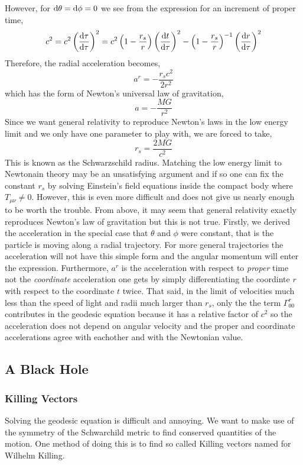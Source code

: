 \documentclass[11pt, a4paper]{article}
\begin{document}
However, for $\mathrm{d}\theta = \mathrm{d}\phi = 0$ we see from the expression for an increment of proper time,
\[ c^2  = c^2 \left( \frac{\mathrm{d}\tau}{\mathrm{d}\tau} \right)^2 =  c^2 \left(1 - \frac{r_s}{r} \right) \left( \frac{\mathrm{d}t}{\mathrm{d}\tau} \right)^2 - \left(1 - \frac{r_s}{r} \right)^{-1} \left( \frac{\mathrm{d}r}{\mathrm{d}\tau} \right)^2 \]
Therefore, the radial acceleration becomes,
\[ a^r  = -\frac{r_s c^2}{2r^2} \]
which has the form of Newton's universal law of gravitation,
\[ a = - \frac{MG}{r^2}\]
Since we want general relativity to reproduce Newton's laws in the low energy limit and we only have one parameter to play with, we are forced to take,
\[ r_s = \frac{2 M G}{c^2} \]
This is known as the Schwarzschild radius. Matching the low energy limit to Newtonain theory may be an unsatisfying argument and if so one can fix the constant $r_s$ by solving Einstein's field equations inside the compact body where $T_{\mu \nu} \neq 0$. However, this is even more difficult and does not give us nearly enough to be worth the trouble. From above, it may seem that general relativity exactly reproduces Newton's law of gravitation but this is not true. Firstly, we derived the acceleration in the special case that $\theta$ and $\phi$ were constant, that is the particle is moving along a radial trajectory. For more general trajectories the acceleration will not have this simple form and the angular momentum will enter the expression. Furthermore, $a^r$ is the acceleration with respect to \textit{proper} time not the \textit{coordinate} acceleration one gets by simply differentiating the coordinte $r$ with respect to the coordinate $t$ twice. That said, in the limit of velocities much less than the speed of light and radii much larger than $r_s$, only the the term $\Gamma^r_{00}$ contributes in the geodesic equation because it has a relative factor of $c^2$ so the acceleration does not depend on angular velocity and the proper and coordinate accelerations agree with eachother and with the Newtonian value.   

\subsection{A Black Hole}  


\subsubsection{Killing Vectors}

Solving the geodesic equation is difficult and annoying. We want to make use of the symmetry of the Schwarchild metric to find conserved quantities of the motion. One method of doing this is to find so called Killing vectors named for Wilhelm Killing.
\end{document}
